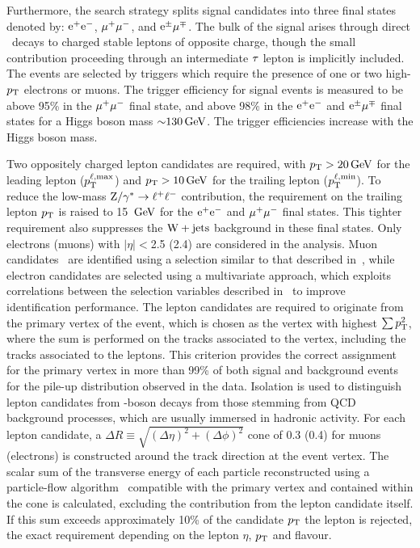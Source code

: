 \documentclass[11pt,twoside,a4paper,cmspaper,final,collab]{cms-tdr}
\begin{document}
Furthermore, the search strategy splits signal candidates into
three final states denoted by: $\mathrm{e}^+\mathrm{e}^-$, ${\mu^+}{\mu^-}$, and
$\mathrm{e}^{\pm}{\mu}^{\mp}$.
The bulk of the signal arises through direct \PW\ decays to charged
stable leptons of opposite charge, though the small contribution
proceeding through an intermediate $\tau$ lepton is implicitly included.
The events are selected by triggers which require
the presence of one or two high-$p_{\mathrm{T}}$ electrons or muons.
The trigger efficiency for signal events is measured to be above 95\% in the ${\mu^+}{\mu^-}$
final state, and above 98\% in the $\mathrm{e}^+\mathrm{e}^-$ and $\mathrm{e}^{\pm}{\mu}^{\mp}$ final states for a
Higgs boson mass ${\sim}130\,\text{Ge\hspace{-.08em}V}$. The trigger efficiencies increase with the Higgs boson mass.

Two oppositely charged lepton candidates are required, with $p_{\mathrm{T}} >20\,\text{Ge\hspace{-.08em}V}$ for
the leading lepton ($p_{\mathrm{T}}^{\mathrm{\ell},\mathrm{max}}$) and $p_{\mathrm{T}} >10\,\text{Ge\hspace{-.08em}V}$ for the trailing lepton ($p_{\mathrm{T}}^{\mathrm{\ell},\mathrm{min}}$).
To reduce the low-mass $\mathrm{Z}/\gamma^*\to \ell^+\ell^-$ contribution, the requirement on the trailing lepton $p_{\mathrm{T}}$ is raised to 15 $\,\text{Ge\hspace{-.08em}V}$
for the $\mathrm{e}^+\mathrm{e}^-$ and ${\mu^+}{\mu^-}$ final states. This tighter requirement also
suppresses the $\mathrm{W}+\mathrm{jets}$ background in these final states. Only electrons (muons) with $|\eta| <$2.5 (2.4) are considered in the analysis.
Muon candidates~\cite{muonpas} are identified using a selection similar
to that described in~\cite{HWW2010}, while
electron candidates are selected using a multivariate
approach, which exploits correlations between the selection variables
described in~\cite{egmpas} to improve identification performance.
The lepton candidates are required to originate from the primary vertex of the
event, which is chosen as the vertex with highest $\sum p_{\mathrm{T}}^2$, where the sum
is performed on the tracks associated to the vertex, including
the tracks associated to the leptons.
This criterion provides the correct assignment for the
primary vertex in more than 99\% of both signal and
background events for the pile-up distribution observed in the data.
Isolation is used to distinguish lepton candidates from \PW-boson decays from those
stemming from QCD background processes, which are usually immersed in hadronic activity.
For each lepton candidate, a $\Delta R \equiv\sqrt{(\Delta\eta)^2 + (\Delta\phi)^2}$ cone
of 0.3 (0.4) for muons (electrons) is constructed around the track direction at the event vertex.
The scalar sum of the transverse energy of each
particle reconstructed using a particle-flow algorithm~\cite{PFT-09-001} compatible with the
primary vertex and contained within the cone is calculated,
excluding the contribution from the lepton candidate itself. If this
sum exceeds approximately 10\% of the candidate $p_{\mathrm{T}}$ the lepton is
rejected, the exact requirement depending on the lepton $\eta$, $p_{\mathrm{T}}$ and
flavour.
\end{document}
